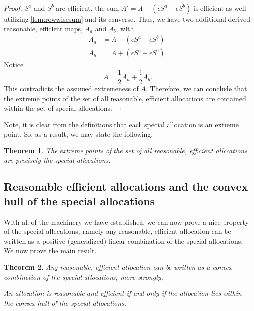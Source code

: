 \documentclass[12pt,letterpaper,final]{article}
\theoremstyle{plain}
\newtheorem{theorem}{Theorem}[section]
\theoremstyle{plain}
\theoremstyle{plain}
\theoremstyle{plain}
\theoremstyle{plain}
\theoremstyle{plain}
\theoremstyle{plain}
\theoremstyle{definition}
\theoremstyle{definition}
\theoremstyle{definition}
\theoremstyle{definition}
\theoremstyle{definition}
\theoremstyle{remark}
\theoremstyle{remark}
\theoremstyle{remark}
\theoremstyle{remark}
\begin{document}
\begin{proof}
  \(S^a\) and \(S^b\) are efficient, the sum
  \(A' = A\pm(\epsilon S^a - \epsilon S^b)\) is efficient as well
  utilizing \cref{lem:rowwisesum} and its converse.
  Thus, we have two additional derived reasonable, efficient 
  maps, \(A_a\) and \(A_b\), with
  \begin{align*}
    A_a & = A - (\epsilon S^a - \epsilon S^b)\\
    A_b & = A + (\epsilon S^a - \epsilon S^b).
  \end{align*}
  Notice
  \[
    A = \frac{1}{2} A_a + \frac{1}{2} A_b.
  \]
  This contradicts the assumed extremeness of \(A\). Therefore, we can
  conclude that the extreme points of the set of all reasonable,
  efficient allocations are   contained within the set of special allocations. 
\end{proof}

Note, it is clear from the definitions that each special allocation is
an extreme point. So, as a result, we may state the following.

\begin{theorem}
  The extreme points of the set of all reasonable, efficient
  allocations are precisely the special allocations.
\end{theorem}

\subsection{Reasonable efficient allocations and the convex hull of
  the special allocations}

With all of the machinery we have established, we can now prove a nice
property of the special allocations, namely any reasonable,
efficient allocation can be written as a
positive (generalized) linear combination of the special allocations. 
We now prove the main result.

\begin{theorem}\label{thm:saavConvexHullRAAV}
  Any reasonable, efficient allocation can be written as a convex
  combination of the special allocations, more strongly, 
  \begin{center}
    An allocation is reasonable and efficient if and only if the
    allocation lies within the convex hull of the special allocations.
  \end{center}
\end{theorem}
\end{document}
